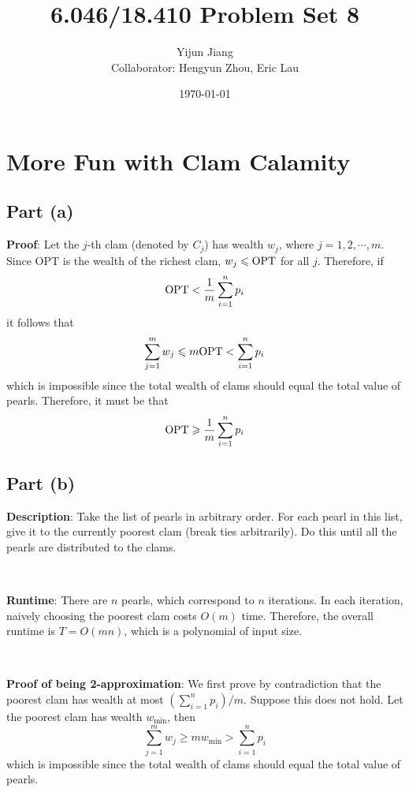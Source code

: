 \documentclass{article}
\title{6.046/18.410 Problem Set 8}
\author{Yijun Jiang\vspace{3pt}\\Collaborator: Hengyun Zhou, Eric Lau}
\date{\today}
\begin{document}
\maketitle

\section{More Fun with Clam Calamity}
\subsection{Part (a)}
\noindent\textbf{Proof}: Let the $j$-th clam (denoted by $C_j$) has wealth $w_j$, where $j=1,2,\cdots,m$. Since OPT is the wealth of the richest clam, $w_j\leqslant\textup{OPT}$ for all $j$. Therefore, if
\begin{equation*}
\textup{OPT}<\frac{1}{m}\sum_{i=1}^np_i
\end{equation*}
it follows that
\begin{equation*}
\sum_{j=1}^mw_j\leqslant m\textup{OPT}<\sum_{i=1}^np_i
\end{equation*}
which is impossible since the total wealth of clams should equal the total value of pearls. Therefore, it must be that
\begin{equation*}
\textup{OPT}\geqslant\frac{1}{m}\sum_{i=1}^np_i
\end{equation*}

\subsection{Part (b)}
\noindent\textbf{Description}: Take the list of pearls in arbitrary order. For each pearl in this list, give it to the currently poorest clam (break ties arbitrarily). Do this until all the pearls are distributed to the clams.

~

\noindent\textbf{Runtime}: There are $n$ pearls, which correspond to $n$ iterations. In each iteration, naively choosing the poorest clam costs $O(m)$ time. Therefore, the overall runtime is $T=O(mn)$, which is a polynomial of input size.

~

\noindent\textbf{Proof of being 2-approximation}: We first prove by contradiction that the poorest clam has wealth at most $(\sum_{i=1}^np_i)/m$. Suppose this does not hold. Let the poorest clam has wealth $w_{\min}$, then
\begin{equation*}
\sum_{j=1}^mw_j\geqslant mw_{\min}>\sum_{i=1}^np_i
\end{equation*}
which is impossible since the total wealth of clams should equal the total value of pearls.
\end{document}
